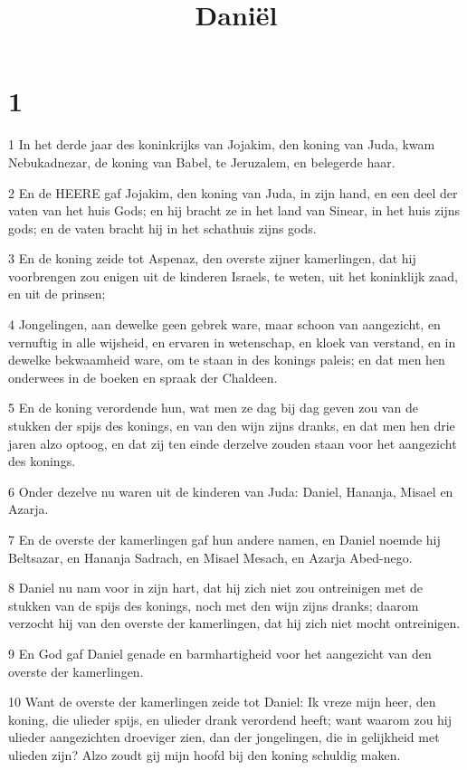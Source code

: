 

\title{Daniël}



\chapter{1}

\par 1 In het derde jaar des koninkrijks van Jojakim, den koning van Juda, kwam Nebukadnezar, de koning van Babel, te Jeruzalem, en belegerde haar.
\par 2 En de HEERE gaf Jojakim, den koning van Juda, in zijn hand, en een deel der vaten van het huis Gods; en hij bracht ze in het land van Sinear, in het huis zijns gods; en de vaten bracht hij in het schathuis zijns gods.
\par 3 En de koning zeide tot Aspenaz, den overste zijner kamerlingen, dat hij voorbrengen zou enigen uit de kinderen Israels, te weten, uit het koninklijk zaad, en uit de prinsen;
\par 4 Jongelingen, aan dewelke geen gebrek ware, maar schoon van aangezicht, en vernuftig in alle wijsheid, en ervaren in wetenschap, en kloek van verstand, en in dewelke bekwaamheid ware, om te staan in des konings paleis; en dat men hen onderwees in de boeken en spraak der Chaldeen.
\par 5 En de koning verordende hun, wat men ze dag bij dag geven zou van de stukken der spijs des konings, en van den wijn zijns dranks, en dat men hen drie jaren alzo optoog, en dat zij ten einde derzelve zouden staan voor het aangezicht des konings.
\par 6 Onder dezelve nu waren uit de kinderen van Juda: Daniel, Hananja, Misael en Azarja.
\par 7 En de overste der kamerlingen gaf hun andere namen, en Daniel noemde hij Beltsazar, en Hananja Sadrach, en Misael Mesach, en Azarja Abed-nego.
\par 8 Daniel nu nam voor in zijn hart, dat hij zich niet zou ontreinigen met de stukken van de spijs des konings, noch met den wijn zijns dranks; daarom verzocht hij van den overste der kamerlingen, dat hij zich niet mocht ontreinigen.
\par 9 En God gaf Daniel genade en barmhartigheid voor het aangezicht van den overste der kamerlingen.
\par 10 Want de overste der kamerlingen zeide tot Daniel: Ik vreze mijn heer, den koning, die ulieder spijs, en ulieder drank verordend heeft; want waarom zou hij ulieder aangezichten droeviger zien, dan der jongelingen, die in gelijkheid met ulieden zijn? Alzo zoudt gij mijn hoofd bij den koning schuldig maken.
